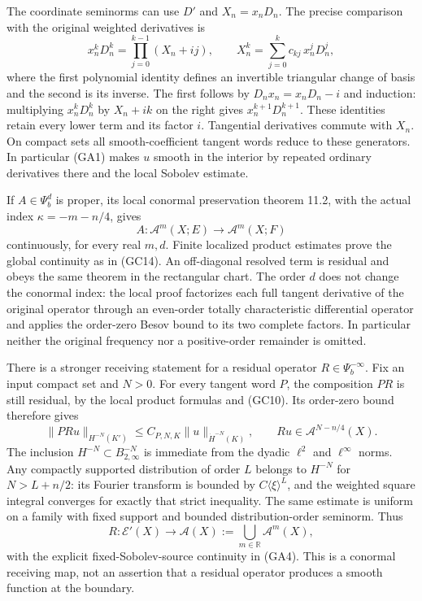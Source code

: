 \documentclass[
  11pt,
]{article}
\begin{document}
The coordinate seminorms can use \(D'\) and \(X_n=x_nD_n\). The precise
comparison with the original weighted derivatives is \[
 x_n^kD_n^k=\prod_{j=0}^{k-1}(X_n+ij),\qquad
 X_n^k=\sum_{j=0}^k c_{kj}\,x_n^jD_n^j,
 \tag{GA2}
\] where the first polynomial identity defines an invertible triangular
change of basis and the second is its inverse. The first follows by
\(D_n x_n=x_nD_n-i\) and induction: multiplying \(x_n^kD_n^k\) by
\(X_n+ik\) on the right gives \(x_n^{k+1}D_n^{k+1}\). These identities
retain every lower term and its factor \(i\). Tangential derivatives
commute with \(X_n\). On compact sets all smooth-coefficient tangent
words reduce to these generators. In particular (GA1) makes \(u\) smooth
in the interior by repeated ordinary derivatives there and the local
Sobolev estimate.

If \(A\in\Psi_b^d\) is proper, its local conormal preservation theorem
11.2, with the actual index \(\kappa=-m-n/4\), gives \[
 A:\mathcal A^m(X;E)\longrightarrow\mathcal A^m(X;F)
 \tag{GA3}
\] continuously, for every real \(m,d\). Finite localized product
estimates prove the global continuity as in (GC14). An off-diagonal
resolved term is residual and obeys the same theorem in the rectangular
chart. The order \(d\) does not change the conormal index: the local
proof factorizes each full tangent derivative of the original operator
through an even-order totally characteristic differential operator and
applies the order-zero Besov bound to its two complete factors. In
particular neither the original frequency nor a positive-order remainder
is omitted.

There is a stronger receiving statement for a residual operator
\(R\in\Psi_b^{-\infty}\). Fix an input compact set and \(N>0\). For
every tangent word \(P\), the composition \(PR\) is still residual, by
the local product formulas and (GC10). Its order-zero bound therefore
gives \[
 \|PRu\|_{H^{-N}(K')}\le C_{P,N,K}\|u\|_{\dot H^{-N}(K)},
 \qquad
 Ru\in\mathcal A^{N-n/4}(X).
 \tag{GA4}
\] The inclusion \(H^{-N}\subset B^{-N}_{2,\infty}\) is immediate from
the dyadic \(\ell^2\) and \(\ell^\infty\) norms. Any compactly supported
distribution of order \(L\) belongs to \(H^{-N}\) for \(N>L+n/2\): its
Fourier transform is bounded by \(C\langle\xi\rangle^L\), and the
weighted square integral converges for exactly that strict inequality.
The same estimate is uniform on a family with fixed support and bounded
distribution-order seminorm. Thus \[
 R:\mathcal E'(X)\longrightarrow
       \mathcal A(X):=\bigcup_{m\in\mathbb R}\mathcal A^m(X),
 \tag{GA5}
\] with the explicit fixed-Sobolev-source continuity in (GA4). This is a
conormal receiving map, not an assertion that a residual operator
produces a smooth function at the boundary.
\end{document}
